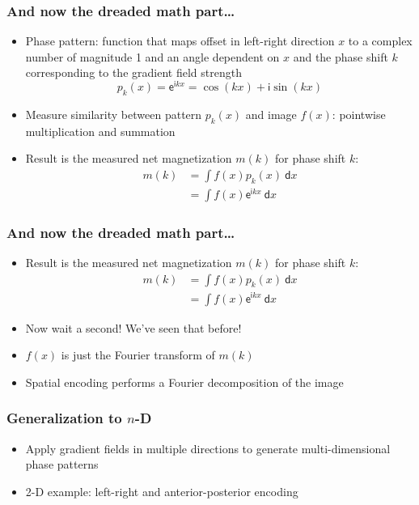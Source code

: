 \begin{frame}
	\frametitle{And now the dreaded math part\ldots}
	
	\begin{itemize}
		\item Phase pattern: function that maps offset in left-right direction $x$ to a complex number of magnitude 1 and an angle dependent on $x$ and the phase shift $k$ corresponding to the gradient field strength
		$$p_k(x) = \mathsf e^{\mathsf ikx} = \cos(kx) + \mathsf i \sin(kx)$$
		
		\item<2> Measure similarity between pattern $p_k(x)$ and image $f(x)$: pointwise multiplication and summation
		\item<2> Result is the measured net magnetization $m(k)$ for phase shift $k$:
		\begin{align*}
			m(k) &= \int f(x)p_k(x)\ \mathsf dx \\
			     &= \int f(x)\mathsf e^{\mathsf ikx}\ \mathsf dx
		\end{align*}
	\end{itemize}
\end{frame}

\begin{frame}
	\frametitle{And now the dreaded math part\ldots}
	\begin{itemize}
		\item Result is the measured net magnetization $m(k)$ for phase shift $k$:
		\begin{align*}
			m(k) &= \int f(x)p_k(x)\ \mathsf dx \\
			     &= \int f(x)\mathsf e^{\mathsf ikx}\ \mathsf dx
		\end{align*}
		
		\item Now wait a second! We've seen that before!
		\item<2> $f(x)$ is just the Fourier transform of $m(k)$
		\item<2> Spatial encoding performs a Fourier decomposition of the image
	\end{itemize}
\end{frame}

\begin{frame}
	\frametitle{Generalization to $n$-D}
	
	\begin{itemize}
		\item Apply gradient fields in multiple directions to generate multi-dimensional phase patterns
		\item 2-D example: left-right and anterior-posterior encoding
	\end{itemize}
	\begin{center}
		\begingroup
		
		\endgroup
	\end{center}
\end{frame}

